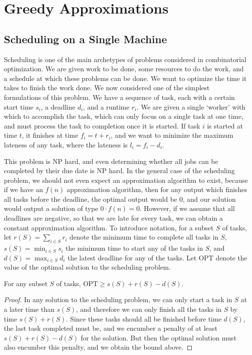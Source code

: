 \chapter{Greedy Approximations}

\section{Scheduling on a Single Machine}

Scheduling is one of the main archetypes of problems considered in combinatorial optimization. We are given work to be done, some resources to do the work, and a schedule at which these problems can be done. We want to optimize the time it takes to finish the work done. We now considered one of the simplest formulations of this problem. We have a sequence of task, each with a certain start time $s_i$, a deadline $d_i$, and a runtime $r_i$. We are given a single `worker' with which to accomplish the task, which can only focus on a single task at one time, and must process the task to completion once it is started. If task $i$ is started at time $t$, it finishes at time $f_i = t + r_i$, and we want to minimize the maximum lateness of any task, where the lateness is $l_i = f_i - d_i$.

This problem is NP hard, and even determining whether all jobs can be completed by their due date is NP hard. In the general case of the scheduling problem, we should not even expect an approximation algorithm to exist, because if we have an $f(n)$ approximation algorithm, then for any output which finishes all tasks before the deadline, the optimal output would be $0$, and our solution would output a solution of type $0 \cdot f(n) = 0$. However, if we assume that all deadlines are negative, so that we are late for every task, we can obtain a constant approximation algorithm. To introduce notation, for a subset $S$ of tasks, let $r(S) = \sum_{i \in S} r_i$ denote the minimum time to complete all tasks in $S$, $s(S) = \min_{i \in S} s_i$ the minimum time to start any of the tasks in $S$, and $d(S) = \max_{i \in S} d_i$ the latest deadline for any of the tasks. Let $\text{OPT}$ denote the value of the optimal solution to the scheduling problem.

\begin{prop}
    For any subset $S$ of tasks, $\text{OPT} \geq s(S) + r(S) - d(S)$.
\end{prop}
\begin{proof}
    In any solution to the scheduling problem, we can only start a task in $S$ at a later time than $s(S)$, and therefore we can only finish all the tasks in $S$ by time $s(S) + r(S)$. Since these tasks should all be finished before time $d(S)$, the last task completed must be, and we encumber a penalty of at least $s(S) + r(S) - d(S)$ for the solution. But then the optimal solution must also encumber this penalty, and we obtain the bound above.
\end{proof}


